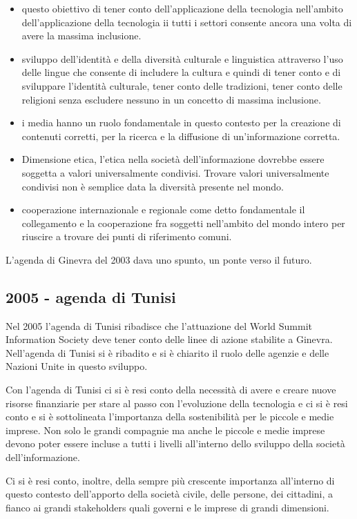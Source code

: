 \begin{itemize}
    \item questo obiettivo di tener conto dell'applicazione della tecnologia nell'ambito dell'applicazione della tecnologia ii tutti i settori consente ancora una volta di avere la massima inclusione.
    \item sviluppo dell'identità e della diversità culturale e linguistica attraverso l'uso delle lingue che consente di includere la cultura e quindi di tener conto e di sviluppare l'identità culturale, tener conto delle tradizioni, tener conto delle religioni senza escludere nessuno in un concetto di massima inclusione.
    \item i media hanno un ruolo fondamentale in questo contesto per la creazione di contenuti corretti, per la ricerca e la diffusione di un'informazione corretta.
    \item Dimensione etica, l'etica nella società dell'informazione dovrebbe essere soggetta a valori universalmente condivisi. Trovare valori universalmente condivisi non è semplice data la diversità presente nel mondo.
    \item cooperazione internazionale e regionale come detto fondamentale il collegamento e la cooperazione fra soggetti nell'ambito del mondo intero per riuscire a trovare dei punti di riferimento comuni.
\end{itemize}


  L'agenda di Ginevra del 2003 dava uno spunto, un ponte verso il futuro. 
  
\subsection{2005 - agenda di Tunisi}
  
  Nel 2005 l'agenda di Tunisi ribadisce che l'attuazione del World Summit Information Society deve tener conto delle linee di azione stabilite a Ginevra. Nell'agenda di Tunisi si è ribadito e si è chiarito il ruolo delle agenzie e delle Nazioni Unite in questo sviluppo. \par
  Con l'agenda di Tunisi ci si è resi conto della necessità di avere e creare nuove risorse finanziarie per stare al passo con l'evoluzione della tecnologia e ci si è resi conto e si è sottolineata l'importanza della sostenibilità per le piccole e medie imprese. Non solo le grandi compagnie ma anche le piccole e medie imprese devono poter essere incluse a tutti i livelli all'interno dello sviluppo della società dell'informazione.\par 
  Ci si è resi conto, inoltre, della sempre più crescente importanza all'interno di questo contesto dell'apporto della società civile, delle persone, dei cittadini, a fianco ai grandi stakeholders quali governi e le imprese di grandi dimensioni. 
  
